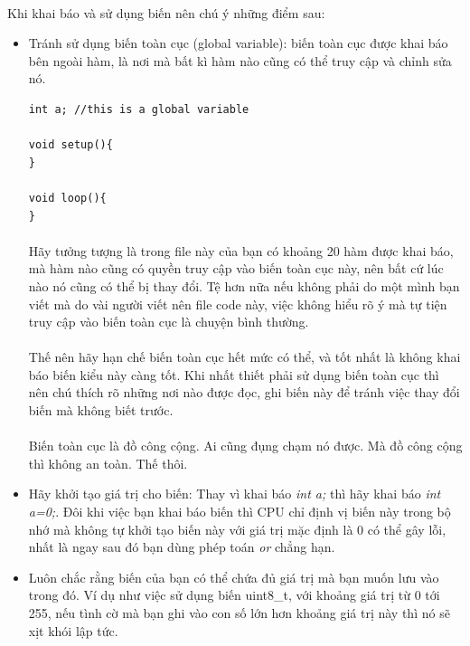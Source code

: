 \documentclass[12pt,a5paper]{book}
\begin{document}
\paragraph{}
Khi khai báo và sử dụng biến nên chú ý những điểm sau:
\begin{itemize}
\item Tránh sử dụng biến toàn cục (global variable): biến toàn cục được khai báo bên ngoài hàm, là nơi mà bất kì hàm nào cũng có thể truy cập và chỉnh sửa nó. 
\begin{lstlisting}
int a; //this is a global variable

void setup(){
}

void loop(){
}
\end{lstlisting}
\paragraph{}
Hãy tưởng tượng là trong file này của bạn có khoảng 20 hàm được khai báo, mà hàm nào cũng có quyền truy cập vào biến toàn cục này, nên bất cứ lúc nào nó cũng có thể bị thay đổi. Tệ hơn nữa nếu không phải do một mình bạn viết mà do vài người viết nên file code này, việc không hiểu rõ ý mà tự tiện truy cập vào biến toàn cục là chuyện bình thường.
\paragraph{}
Thế nên hãy hạn chế biến toàn cục hết mức có thể, và tốt nhất là không khai báo biến kiểu này càng tốt. Khi nhất thiết phải sử dụng biến toàn cục thì nên chú thích rõ những nơi nào được đọc, ghi biến này để tránh việc thay đổi biến mà không biết trước.
\paragraph{}
Biến toàn cục là đồ công cộng. Ai cũng đụng chạm nó được. Mà đồ công cộng thì không an toàn. Thế thôi.
\item Hãy khởi tạo giá trị cho biến: Thay vì khai báo \textit{int a;} thì hãy khai báo \textit{int a=0;}. Đôi khi việc bạn khai báo biến thì CPU chỉ định vị biến này trong bộ nhớ mà không tự khởi tạo biến này với giá trị mặc định là 0 có thể gây lỗi, nhất là ngay sau đó bạn dùng phép toán \textit{or} chẳng hạn.
\item Luôn chắc rằng biến của bạn có thể chứa đủ giá trị mà bạn muốn lưu vào trong đó. Ví dụ như việc sử dụng biến uint8\_t, với khoảng giá trị từ 0 tới 255, nếu tình cờ mà bạn ghi vào con số lớn hơn khoảng giá trị này thì nó sẽ xịt khói lập tức.
\end{itemize}
\end{document}
